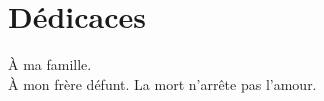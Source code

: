 \chapter*{D\'edicaces}
\vfill
\begin{center}
\`A ma famille.\\
\vspace{1.5cm}
\`A mon frère défunt. La mort n’arrête pas l’amour.

\end{center}
\vfill
